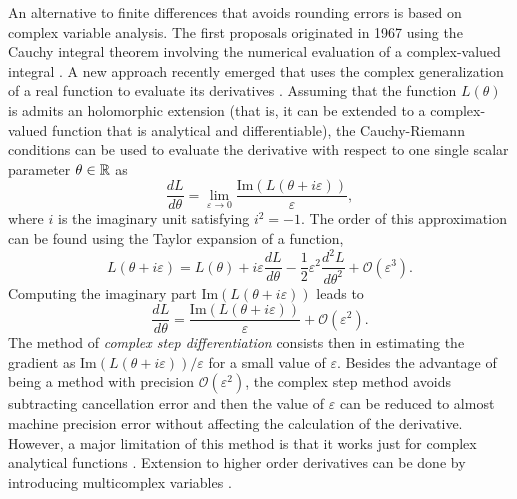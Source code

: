 An alternative to finite differences that avoids rounding errors is based on complex variable analysis. 
The first proposals originated in 1967 using the Cauchy integral theorem involving the numerical evaluation of a complex-valued integral \cite{Lyness_1967, Lyness_Moler_1967}.
A new approach recently emerged that uses the complex generalization of a real function to evaluate its derivatives \cite{Squire_Trapp_1998_complex_diff, Martins_Sturdza_Alonso_2003_complex_differentiation}. 
Assuming that the function $L(\theta)$ is admits an holomorphic extension (that is, it can be extended to a complex-valued function that is analytical and differentiable\cite{stein2010complex}), the Cauchy-Riemann conditions can be used to evaluate the derivative with respect to one single scalar parameter $\theta \in \operatorname{\mathbb{R}}$ as
\begin{equation}
    \frac{dL}{d\theta} = \lim_{\varepsilon \rightarrow 0} \frac{\text{Im}(L(\theta + i \varepsilon))}{\varepsilon},
\end{equation}
where $i$ is the imaginary unit satisfying $i^2 = -1$. 
The order of this approximation can be found using the Taylor expansion of a function,
\begin{equation}
    L(\theta + i \varepsilon)
    = 
    L(\theta) + i \varepsilon \frac{dL}{d\theta} 
    - 
    \frac 1 2  \varepsilon^2
    \frac{d^2 L}{d\theta^2}
    + 
    \mathcal O (\varepsilon^3).
\end{equation}
Computing the imaginary part $\text{Im}(L(\theta + i \varepsilon))$ leads to
\begin{equation}
    \frac{dL}{d\theta} 
    = 
    \frac{\text{Im}(L(\theta + i \varepsilon))}{\varepsilon}
    + 
    \mathcal{O} (\varepsilon^2).
\end{equation}
The method of \textit{complex step differentiation} consists then in estimating the gradient as $\text{Im}(L(\theta + i \varepsilon)) / \varepsilon$ for a small value of $\varepsilon$. 
Besides the advantage of being a method with precision $\mathcal{O}(\varepsilon^2)$, the complex step method avoids subtracting cancellation error and then the value of $\varepsilon$ can be reduced to almost machine precision error without affecting the calculation of the derivative. 
However, a major limitation of this method is that it works just for complex analytical functions \cite{Martins_Sturdza_Alonso_2003_complex_differentiation}.
Extension to higher order derivatives can be done by introducing multicomplex variables \cite{Lantoine_Russell_Dargent_2012}. 

